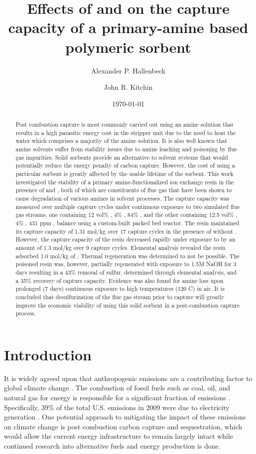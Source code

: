 \documentclass[journal=iecred,manuscript=article]{achemso}
\author{Alexander P. Hallenbeck}
\author{John R. Kitchin}
\affiliation[National Energy Technology Laboratory-Regional University Alliance (NETL-RUA)]{National Energy Technology Laboratory-Regional University Alliance (NETL-RUA), Pittsburgh, Pennsylvania 15236}
\date{\today}
\title{Effects of \ce{O_2} and \ce{SO_2} on the capture capacity of a primary-amine based polymeric \ce{CO_2} sorbent}
\begin{document}
\begin{abstract}
Post combustion  capture is most commonly carried out using an amine solution that results in a high parasitic energy cost in the stripper unit due to the need to heat the water which comprises a majority of the amine solution. It is also well known that amine solvents suffer from stability issues due to amine leaching and poisoning by flue gas impurities.
 Solid sorbents provide an alternative to solvent systems that would potentially reduce the energy penalty of carbon capture. However, the cost of using a particular sorbent is greatly affected by the usable lifetime of the sorbent. This work investigated the stability of a primary amine-functionalized ion exchange resin in the presence of  and , both of which are constituents of flue gas that have been shown to cause degradation of various amines in solvent processes. The  capture capacity was measured over multiple capture cycles under continuous exposure to two simulated flue gas streams, one containing 12 vol\% , 4\% , 84\% , and the other containing 12.5 vol\% , 4\% , 431 ppm , balance  using a custom-built packed bed reactor. The resin maintained its  capture capacity of 1.31 mol/kg over 17 capture cycles in the presence of  without . However, the  capture capacity of the resin decreased rapidly under exposure to  by an amount of 1.3 mol/kg over 9 capture cycles. Elemental analysis revealed the resin adsorbed 1.0 mol/kg of . Thermal regeneration was determined to not be possible. The poisoned resin was, however, partially regenerated with exposure to 1.5M NaOH for 3 days resulting in a 43\% removal of sulfur, determined through elemental analysis, and a 35\% recovery of  capture capacity. Evidence was also found for amine loss upon prolonged (7 days) continuous exposure to high temperatures (120 \textdegree{}C) in air. It is concluded that desulfurization of the flue gas stream prior to  capture will greatly improve the economic viability of using this solid sorbent in a post-combustion  capture process.  
\end{abstract}

\section{Introduction}
\label{sec-1}
It is widely agreed upon that anthropogenic  emissions are a contributing factor to global climate change \cite{working05:ipcc}.  The combustion of fossil fuels such as coal, oil, and natural gas for energy is responsible for a significant fraction of  emissions \cite{agency12:co-emiss-fuel-combus}.  Specifically, 39\% of the total U.S.  emissions in 2009 were due to electricity generation \cite{epa-inventory}.   One potential approach to mitigating the impact of these emissions on climate change is post combustion carbon capture and sequestration, which would allow the current energy infrastructure to remain largely intact while continued research into alternative fuels and energy production is done.
\end{document}
